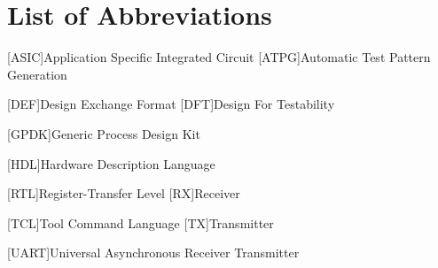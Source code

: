 \section*{List of Abbreviations}
\begin{acronym}
	[ASIC]{Application Specific Integrated Circuit}
	[ATPG]{Automatic Test Pattern Generation}
	
	[DEF]{Design Exchange Format}
	[DFT]{Design For Testability}
		
	[GPDK]{Generic Process Design Kit}
		
	[HDL]{Hardware Description Language}
		
	[RTL]{Register-Transfer Level}
	[RX]{Receiver}
		
	[TCL]{Tool Command Language}
	[TX]{Transmitter}
	
	[UART]{Universal Asynchronous Receiver Transmitter}
	
\end{acronym}


